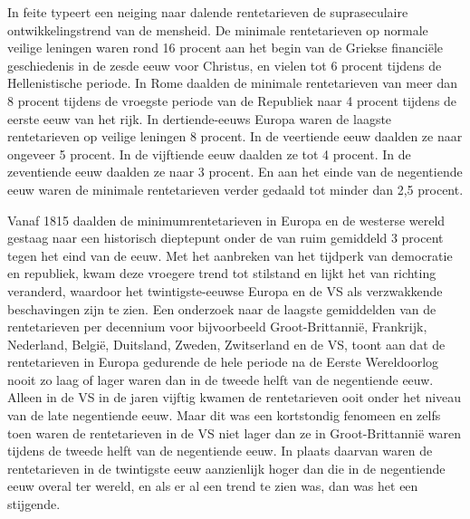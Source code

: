 \begin{blockquotebox}
    In feite typeert een neiging naar dalende rentetarieven de supraseculaire ontwikkelingstrend van de mensheid. De minimale rentetarieven op \textquotesingle normale veilige leningen\textquotesingle{} waren rond 16 procent aan het begin van de Griekse financiële geschiedenis in de zesde eeuw voor Christus, en vielen tot 6 procent tijdens de Hellenistische periode. In Rome daalden de minimale rentetarieven van meer dan 8 procent tijdens de vroegste periode van de Republiek naar 4 procent tijdens de eerste eeuw van het rijk. In dertiende-eeuws Europa waren de laagste rentetarieven op \textquotesingle veilige\textquotesingle{} leningen 8 procent. In de veertiende eeuw daalden ze naar ongeveer 5 procent. In de vijftiende eeuw daalden ze tot 4 procent. In de zeventiende eeuw daalden ze naar 3 procent. En aan het einde van de negentiende eeuw waren de minimale rentetarieven verder gedaald tot minder dan 2,5 procent.
    \par\vspace{1em}\noindent
    Vanaf 1815 daalden de minimumrentetarieven in Europa en de westerse wereld gestaag naar een historisch dieptepunt onder de van ruim gemiddeld 3 procent tegen het eind van de eeuw. Met het aanbreken van het tijdperk van democratie en republiek, kwam deze vroegere trend tot stilstand en lijkt het van richting veranderd, waardoor het twintigste-eeuwse Europa en de VS als verzwakkende beschavingen zijn te zien. Een onderzoek naar de laagste gemiddelden van de rentetarieven per decennium voor bijvoorbeeld Groot-Brittannië, Frankrijk, Nederland, België, Duitsland, Zweden, Zwitserland en de VS, toont aan dat de rentetarieven in Europa gedurende de hele periode na de Eerste Wereldoorlog nooit zo laag of lager waren dan in de tweede helft van de negentiende eeuw. Alleen in de VS in de jaren vijftig kwamen de rentetarieven ooit onder het niveau van de late negentiende eeuw. Maar dit was een kortstondig fenomeen en zelfs toen waren de rentetarieven in de VS niet lager dan ze in Groot-Brittannië waren tijdens de tweede helft van de negentiende eeuw. In plaats daarvan waren de rentetarieven in de twintigste eeuw aanzienlijk hoger dan die in de negentiende eeuw overal ter wereld, en als er al een trend te zien was, dan was het een stijgende.\footnotemark
\end{blockquotebox}
\autocite{222}

